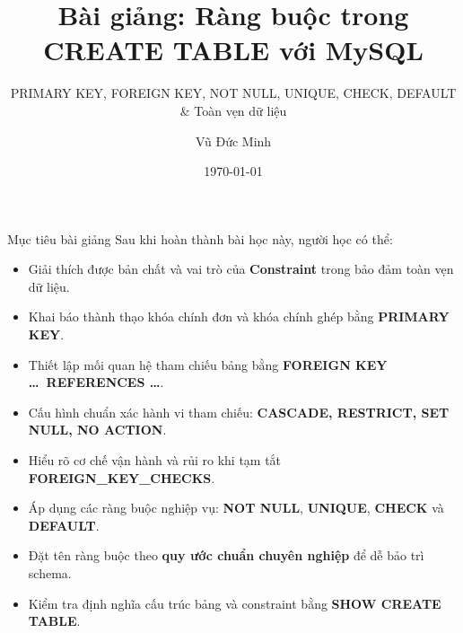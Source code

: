 \documentclass[aspectratio=169,11pt]{beamer}
\title[Ràng buộc trong CREATE TABLE]{Bài giảng: Ràng buộc trong CREATE TABLE với MySQL}
\subtitle{PRIMARY KEY, FOREIGN KEY, NOT NULL, UNIQUE, CHECK, DEFAULT \& Toàn vẹn dữ liệu}
\author[Vũ Đức Minh]{Vũ Đức Minh}
\institute[NEU]{Trường Đại học Kinh tế Quốc dân (NEU), Hà Nội, Việt Nam}
\date{\today}
\newcommand{\kw}[1]{\textcolor{dbblue}{\textbf{#1}}}
\begin{document}
\begin{frame}
  \titlepage
\end{frame}

\begin{frame}{Mục tiêu bài giảng}
Sau khi hoàn thành bài học này, người học có thể:
\begin{itemize}\setlength{\itemsep}{1.5pt}
  \item Giải thích được bản chất và vai trò của \kw{Constraint} trong bảo đảm toàn vẹn dữ liệu.
  \item Khai báo thành thạo khóa chính đơn và khóa chính ghép bằng \kw{PRIMARY KEY}.
  \item Thiết lập mối quan hệ tham chiếu bảng bằng \kw{FOREIGN KEY \dots\ REFERENCES \dots}.
  \item Cấu hình chuẩn xác hành vi tham chiếu: \kw{CASCADE, RESTRICT, SET NULL, NO ACTION}.
  \item Hiểu rõ cơ chế vận hành và rủi ro khi tạm tắt \kw{FOREIGN\_KEY\_CHECKS}.
  \item Áp dụng các ràng buộc nghiệp vụ: \kw{NOT NULL}, \kw{UNIQUE}, \kw{CHECK} và \kw{DEFAULT}.
  \item Đặt tên ràng buộc theo \kw{quy ước chuẩn chuyên nghiệp} để dễ bảo trì schema.
  \item Kiểm tra định nghĩa cấu trúc bảng và constraint bằng \kw{SHOW CREATE TABLE}.
\end{itemize}
\end{frame}
\end{document}
